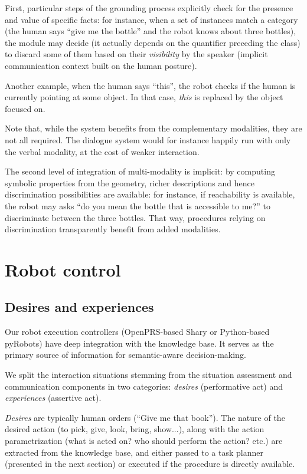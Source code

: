 \documentclass[letterpaper, 10 pt, conference]{ieeeconf}  %
\begin{document}
First, particular steps of the grounding process explicitly check for the
presence and value of specific facts: for instance, when a set of instances
match a category (the human says ``give me the bottle'' and the robot knows
about three bottles), the module may decide (it actually depends on the
quantifier preceding the class) to discard some of them based on their
\emph{visibility} by the speaker (implicit communication context built on the
human posture).

Another example, when the human says ``this'', the robot checks if the human is
currently pointing at some object. In that case, \emph{this} is replaced by the
object focused on.

Note that, while the system benefits from the complementary modalities, they
are not all required. The dialogue system would for instance happily run with
only the verbal modality, at the cost of weaker interaction.

The second level of integration of multi-modality is implicit: by computing
symbolic properties from the geometry, richer descriptions and hence
discrimination possibilities are available: for instance, if reachability is
available, the robot may asks ``do you mean the bottle that is accessible to
me?'' to discriminate between the three bottles. That way, procedures relying
on discrimination transparently benefit from added modalities.

\section{Robot control}
\label{sect|ctrl}

\subsection{Desires and experiences}

Our robot execution controllers (OpenPRS-based {\sc Shary} or Python-based {\sc
pyRobots}) have deep integration with the knowledge base. It serves as the primary source of information for semantic-aware decision-making.

We split the interaction situations stemming from the situation assessment and
communication components in two categories: \emph{desires} (performative act)
and \emph{experiences} (assertive act).

\emph{Desires} are typically human orders (``Give me that book''). The nature
of the desired action (to pick, give, look, bring, show...), along with the
action parametrization (what is acted on? who should perform the action? etc.)
are extracted from the knowledge base, and either passed to a task planner
(presented in the next section) or executed if the procedure is directly
available.
\end{document}
